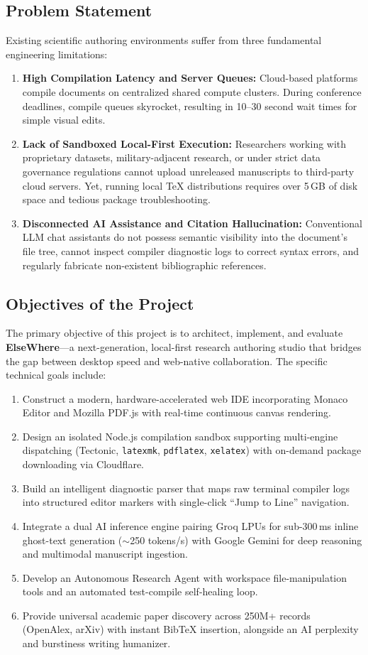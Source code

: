 \documentclass[12pt,a4paper]{article}
\newcommand{\code}[1]{\texttt{#1}}
\begin{document}
\subsection{Problem Statement}
Existing scientific authoring environments suffer from three fundamental engineering limitations:
\begin{enumerate}
    \item \textbf{High Compilation Latency and Server Queues:} Cloud-based platforms compile documents on centralized shared compute clusters. During conference deadlines, compile queues skyrocket, resulting in 10--30 second wait times for simple visual edits.
    \item \textbf{Lack of Sandboxed Local-First Execution:} Researchers working with proprietary datasets, military-adjacent research, or under strict data governance regulations cannot upload unreleased manuscripts to third-party cloud servers. Yet, running local \TeX{} distributions requires over 5\,GB of disk space and tedious package troubleshooting.
    \item \textbf{Disconnected AI Assistance and Citation Hallucination:} Conventional LLM chat assistants do not possess semantic visibility into the document's file tree, cannot inspect compiler diagnostic logs to correct syntax errors, and regularly fabricate non-existent bibliographic references.
\end{enumerate}

\subsection{Objectives of the Project}
The primary objective of this project is to architect, implement, and evaluate \textbf{ElseWhere}---a next-generation, local-first research authoring studio that bridges the gap between desktop speed and web-native collaboration. The specific technical goals include:
\begin{enumerate}
    \item Construct a modern, hardware-accelerated web IDE incorporating Monaco Editor and Mozilla PDF.js with real-time continuous canvas rendering.
    \item Design an isolated Node.js compilation sandbox supporting multi-engine dispatching (Tectonic, \code{latexmk}, \code{pdflatex}, \code{xelatex}) with on-demand package downloading via Cloudflare.
    \item Build an intelligent diagnostic parser that maps raw terminal compiler logs into structured editor markers with single-click ``Jump to Line'' navigation.
    \item Integrate a dual AI inference engine pairing Groq LPUs for sub-300\,ms inline ghost-text generation ($\sim$250 tokens/s) with Google Gemini for deep reasoning and multimodal manuscript ingestion.
    \item Develop an Autonomous Research Agent with workspace file-manipulation tools and an automated test-compile self-healing loop.
    \item Provide universal academic paper discovery across 250M+ records (OpenAlex, arXiv) with instant Bib\TeX{} insertion, alongside an AI perplexity and burstiness writing humanizer.
\end{enumerate}
\end{document}
